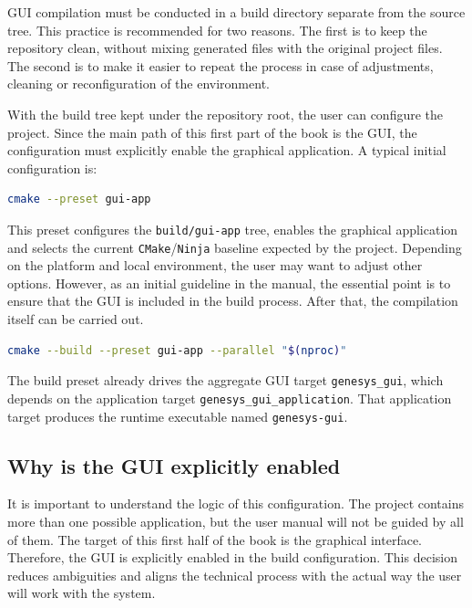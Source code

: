 GUI compilation must be conducted in a build directory separate from the source tree. This practice is recommended for two reasons. The first is to keep the repository clean, without mixing generated files with the original project files. The second is to make it easier to repeat the process in case of adjustments, cleaning or reconfiguration of the environment.

With the build tree kept under the repository root, the user can configure the project. Since the main path of this first part of the book is the GUI, the configuration must explicitly enable the graphical application. A typical initial configuration is:

\begin{lstlisting}[language=bash,caption={Initial GUI Build Configuration},label={lst:cap2_configuracao_gui}]
cmake --preset gui-app
\end{lstlisting}

This preset configures the \texttt{build/gui-app} tree, enables the graphical application and selects the current \texttt{CMake}/\texttt{Ninja} baseline expected by the project. Depending on the platform and local environment, the user may want to adjust other options. However, as an initial guideline in the manual, the essential point is to ensure that the GUI is included in the build process. After that, the compilation itself can be carried out.

\begin{lstlisting}[language=bash,caption={GUI Build Compilation},label={lst:cap2_compilacao_gui}]
cmake --build --preset gui-app --parallel "$(nproc)"
\end{lstlisting}

The build preset already drives the aggregate GUI target \texttt{genesys\_gui}, which depends on the application target \texttt{genesys\_gui\_application}. That application target produces the runtime executable named \texttt{genesys-gui}.

\subsection{Why is the GUI explicitly enabled}
\label{subsec:cap2_por_que_gui_habilitada}

It is important to understand the logic of this configuration. The project contains more than one possible application, but the user manual will not be guided by all of them. The target of this first half of the book is the graphical interface. Therefore, the GUI is explicitly enabled in the build configuration. This decision reduces ambiguities and aligns the technical process with the actual way the user will work with the system.

